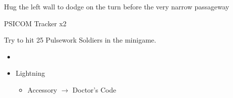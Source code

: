 Hug the left wall to dodge on the turn before the very narrow passageway

\begin{battle}{PSICOM Tracker x2}
 
\end{battle}
\newpage
Try to hit 25 Pulsework Soldiers in the minigame.



\begin{menu}
\begin{multicols}{2}
\begin{itemize}
    \paradigm
    \begin{itemize}
        \item {}%
{\paradigmline{\com}{\rav}{}}%
{\paradigmline[2]{\textit{\com}}{\textit{\syn}}{}}%
{\paradigmline{\med}{\med}{}}%
{\paradigmline{\rav}{\rav}{}}%
{\paradigmline{\rav}{\rav}{}}%
    \end{itemize}
    \equip
    \begin{itemize}
        \item Lightning
        \begin{itemize}
                \item Accessory $\rightarrow$ Doctor's Code
        \end{itemize}
    \end{itemize}
\end{itemize}
\end{multicols}
\end{menu}

